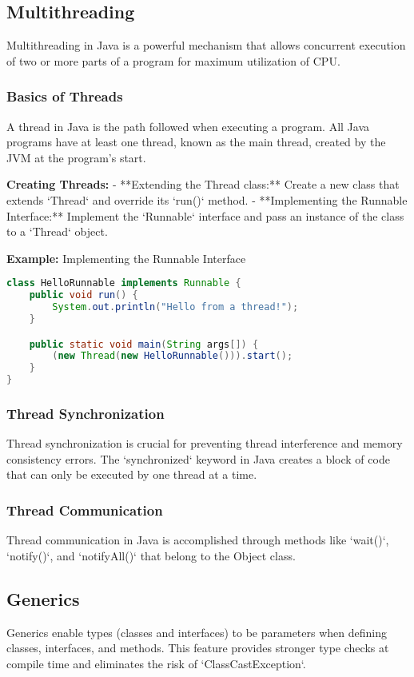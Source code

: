 \documentclass{article}
\begin{document}
\subsection{Multithreading}
Multithreading in Java is a powerful mechanism that allows concurrent execution of two or more parts of a program for maximum utilization of CPU.

\subsubsection{Basics of Threads}
A thread in Java is the path followed when executing a program. All Java programs have at least one thread, known as the main thread, created by the JVM at the program's start.

\textbf{Creating Threads:}
- **Extending the Thread class:** Create a new class that extends `Thread` and override its `run()` method.
- **Implementing the Runnable Interface:** Implement the `Runnable` interface and pass an instance of the class to a `Thread` object.

\textbf{Example:} Implementing the Runnable Interface
\begin{lstlisting}[language=Java]
class HelloRunnable implements Runnable {
    public void run() {
        System.out.println("Hello from a thread!");
    }

    public static void main(String args[]) {
        (new Thread(new HelloRunnable())).start();
    }
}
\end{lstlisting}

\subsubsection{Thread Synchronization}
Thread synchronization is crucial for preventing thread interference and memory consistency errors. The `synchronized` keyword in Java creates a block of code that can only be executed by one thread at a time.

\subsubsection{Thread Communication}
Thread communication in Java is accomplished through methods like `wait()`, `notify()`, and `notifyAll()` that belong to the Object class.

\subsection{Generics}
Generics enable types (classes and interfaces) to be parameters when defining classes, interfaces, and methods. This feature provides stronger type checks at compile time and eliminates the risk of `ClassCastException`.
\end{document}
